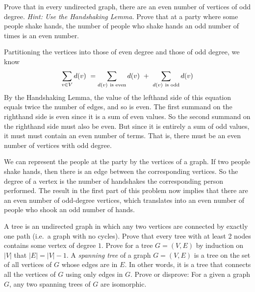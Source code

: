 \documentclass[solution, letterpaper]{cs20}
\begin{document}


\subproblem Prove that in every undirected graph, there are an even number of vertices of odd degree. \emph{Hint: Use the Handshaking Lemma.}
\subproblem Prove that at a party where some people shake hands, the number of people who shake hands an odd number of times is an even number.

\begin{solution} 
\subsolution Partitioning the vertices into those of even degree and those of odd degree, we know
\[
{\sum_{v \in V} d(v)}\ =
\sum_{d(v) \mbox{ {\scriptsize is even}}} d(v)\ +\
\sum_{d(v) \mbox{ {\scriptsize is odd}}} d(v)
\]
By the Handshaking Lemma, the value of the lefthand side of this
equation equals twice the number of edges, and so is even.  The first
summand on the righthand side is even since it is a sum of even
values.  So the second summand on the righthand side must also be even.
But since it is entirely a sum of odd values, it must must contain an even
number of terms.  That is, there must be an even number of vertices with
odd degree.

\subsolution We can represent the people at the party by the vertices of a
graph.  If two people shake hands, then there is an edge between the
corresponding vertices.  So the degree of a vertex is the number of
handshakes the corresponding person performed.  The result in the first
part of this problem now implies that there are an even number of
odd-degree vertices, which translates into an even number of people who
shook an odd number of hands.
\end{solution}

A tree is an undirected graph in which any two vertices are connected by exactly one path (i.e.~a graph with no cycles).  
\subproblem Prove that every tree with at least 2 nodes contains some vertex of degree $1$.
\subproblem Prove for a tree $G=(V,E)$ by induction on $|V|$ that $|E|=|V|-1$.
\subproblem A \emph{spanning tree} of a graph $G=(V,E)$ is a tree on the set of all vertices of $G$ whose edges are in $E$. In other words, it is a tree that connects all the vertices of $G$ using only edges in $G$.  Prove or disprove: For a given a graph $G$, any two spanning trees of $G$ are isomorphic.
\end{document}
